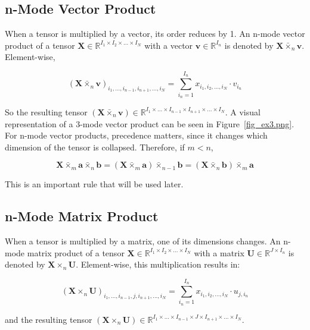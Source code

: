 \documentclass[twocolumn,10pt]{asme2ej}
\begin{document}
\subsection{n-Mode Vector Product}

When a tensor is multiplied by a vector, its order reduces by 1. An n-mode vector product of a tensor $\bm{X} \in \mathbb{R}^{I_1 \times I_2 \times ... \times I_N}$ with a vector $\bm{v} \in \mathbb{R}^{I_n}$ is denoted by $\bm{X} \bar{\times}_n \bm{v}$. Element-wise,

\begin{equation}
(\bm{X} \bar{\times}_n \bm{v} )_{i_1, ..., i_{n-1}, i_{n+1}, ..., i_N} = \sum_{i_n = 1}^{I_n} x_{i_1, i_2, ..., i_N}\cdot v_{i_n}
\end{equation}

So the resulting tensor $(\bm{X} \bar{\times}_n \bm{v} ) \in \mathbb{R}^{I_1 \times ... \times I_{n-1} \times I_{n+1} \times ... \times I_N}$. A visual representation of a 3-mode vector product can be seen in Figure~\ref{fig_ex3.png}.
For n-mode vector products, precedence matters, since it changes which dimension of the tensor is collapsed. Therefore, if $m < n$,

\begin{equation}
\bm{X} \bar{\times}_m \bm{a} \bar{\times}_n \bm{b} = (\bm{X} \bar{\times}_m \bm{a}) \bar{\times}_{n-1} \bm{b} = (\bm{X} \bar{\times}_n \bm{b}) \bar{\times}_m \bm{a}
\label{eq_vectorMode}
\end{equation}

This is an important rule that will be used later.

\subsection{n-Mode Matrix Product}
When a tensor is multiplied by a matrix, one of its dimensions changes. An n-mode matrix product of a tensor $\bm{X} \in \mathbb{R}^{I_1 \times I_2 \times ... \times I_N}$ with a matrix $\bm{U} \in \mathbb{R}^{J \times I_n}$ is denoted by $\bm{X} \times_n \bm{U}$. Element-wise, this multiplication results in:

\begin{equation}
(\bm{X} \times_n \bm{U} )_{i_1, ..., i_{n-1}, j, i_{n+1}, ..., i_N} = \sum_{i_n = 1}^{I_n} x_{i_1, i_2, ..., i_N}\cdot u_{j,i_n}
\end{equation}

\noindent and the resulting tensor $(\bm{X} \times_n \bm{U} ) \in \mathbb{R}^{I_1 \times ... \times I_{n-1} \times J \times I_{n+1} \times ... \times I_N}$.
\end{document}
